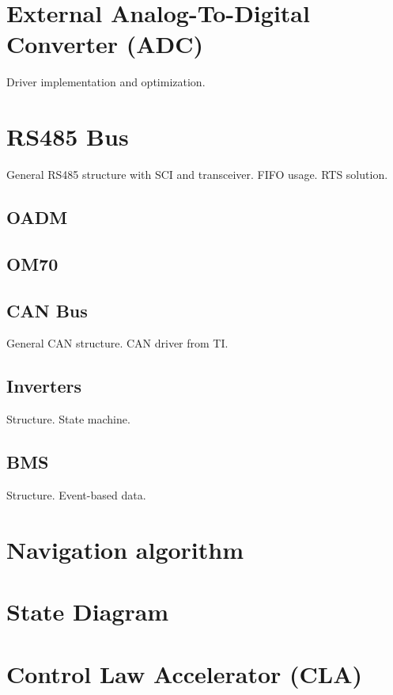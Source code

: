 \section{External Analog-To-Digital Converter (ADC)}

Driver implementation and optimization.

\section{RS485 Bus}

General RS485 structure with SCI and transceiver. FIFO usage. RTS solution.

\subsection{OADM}

\subsection{OM70}

\subsection{CAN Bus}

General CAN structure. CAN driver from TI.

\subsection{Inverters}

Structure. State machine.

\subsection{BMS}

Structure. Event-based data.

\section{Navigation algorithm}

\section{State Diagram}

\section{Control Law Accelerator (CLA)}


